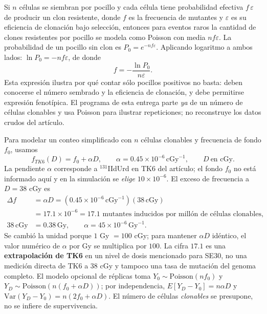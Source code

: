 \documentclass[11pt,a4paper]{article}
\begin{document}
Si $n$ células se siembran por pocillo y cada célula tiene probabilidad efectiva $f\,\varepsilon$ de producir un clon resistente, donde $f$ es la frecuencia de mutantes y $\varepsilon$ es su eficiencia de clonación bajo selección, entonces para eventos raros la cantidad de clones resistentes por pocillo se modela como Poisson con media $nf\varepsilon$. La probabilidad de un pocillo sin clon es $P_0=e^{-nf\varepsilon}$. Aplicando logaritmo a ambos lados: $\ln P_0=-nf\varepsilon$, de donde
\begin{equation}\boxed{f=-\frac{\ln P_0}{n\varepsilon}.}\end{equation}
Esta expresión ilustra por qué contar sólo pocillos positivos no basta: deben conocerse el número sembrado y la eficiencia de clonación, y debe permitirse expresión fenotípica. El programa de esta entrega parte \emph{ya} de un número de células clonables y usa Poisson para ilustrar repeticiones; no reconstruye los datos crudos del artículo.

Para modelar un conteo simplificado con $n$ células clonables y frecuencia de fondo $f_0$, usamos
\begin{equation}f_{TK6}(D)=f_0+\alpha D,\qquad \alpha=0.45\times10^{-6}\,\mathrm{cGy}^{-1},\qquad D\ \text{en cGy}.\end{equation}
La pendiente $\alpha$ corresponde a $^{131}$IIdUrd en TK6 del artículo; el fondo $f_0$ no está informado aquí y en la simulación se \emph{elige} $10\times10^{-6}$. El exceso de frecuencia a $D=38$ cGy es
\begin{align}
\Delta f&=\alpha D=(0.45\times10^{-6}\,\mathrm{cGy}^{-1})(38\,\mathrm{cGy})\\
&=17.1\times10^{-6}=17.1\text{ mutantes inducidos por millón de células clonables},\\
38\,\mathrm{cGy}&=0.38\,\mathrm{Gy},\qquad \alpha=45\times10^{-6}\,\mathrm{Gy}^{-1}.
\end{align}
Se cambió la unidad porque $1$ Gy $=100$ cGy; para mantener $\alpha D$ idéntico, el valor numérico de $\alpha$ por Gy se multiplica por $100$. La cifra $17.1$ es una \textbf{extrapolación de TK6} en un nivel de dosis mencionado para SE30, no una medición directa de TK6 a 38 cGy y tampoco una tasa de mutación del genoma completo. El modelo opcional de réplicas toma $Y_0\sim\mathrm{Poisson}(nf_0)$ y $Y_D\sim\mathrm{Poisson}(n(f_0+\alpha D))$; por independencia, $E[Y_D-Y_0]=n\alpha D$ y $\mathrm{Var}(Y_D-Y_0)=n(2f_0+\alpha D)$. El número de células \emph{clonables} se presupone, no se infiere de supervivencia.
\end{document}
